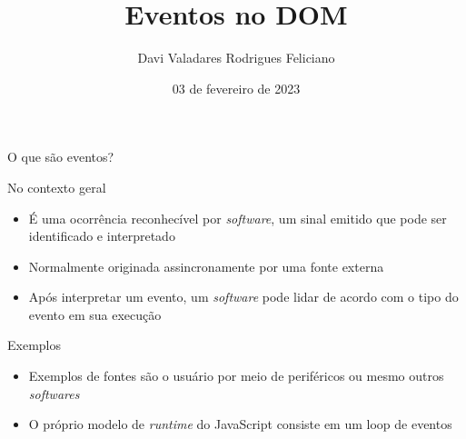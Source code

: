 

\title[Eventos no DOM]{Eventos no DOM}
\author{Davi Valadares Rodrigues Feliciano}
\date{03 de fevereiro de 2023}



\begin{frame}
  \maketitle
\end{frame}

\begin{frame}{O que são eventos?}
  \begin{block}{No contexto geral}
    \begin{itemize}
      \item É uma ocorrência reconhecível por \textit{software}, um sinal emitido que
            pode ser identificado e interpretado
      \item Normalmente originada assincronamente por uma fonte externa
      \item Após interpretar um evento, um \textit{software} pode lidar de acordo com o
            tipo do evento em sua execução
    \end{itemize}
  \end{block}
  \begin{exampleblock}{Exemplos}
    \begin{itemize}
      \item Exemplos de fontes são o usuário por meio de periféricos ou mesmo
            outros \textit{softwares}
      \item O próprio modelo de \textit{runtime} do JavaScript consiste em um loop de
            eventos
    \end{itemize}
  \end{exampleblock}
\end{frame}

